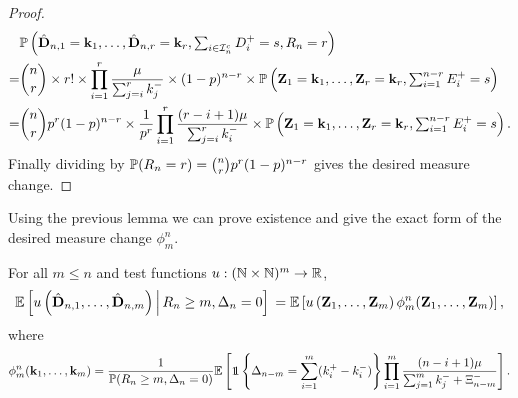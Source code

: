 \begin{proof}
\begin{align*}
        & \P\left(\hat{\vD}_{n, 1} = \vk_1, \ldots, \hat{\vD}_{n, r} = \vk_r, \textstyle \sum_{i \in \cI_n^c} D_i^+ = s, R_n = r \right) \\
        =& \binom{n}{r} \times r!
        \times \prod_{i=1}^r \frac{\mu}{\sum_{j=i}^r k_j^-} \times (1-p)^{n-r}
        \times \P\left(\vZ_1 = \vk_1, \ldots, \vZ_r = \vk_r, \textstyle \sum_{i=1}^{n-r} E_i^+ = s \right) \\
        =& \binom{n}{r} p^r (1-p)^{n-r} \times \frac{1}{p^r} \prod_{i=1}^r \frac{(r-i+1) \mu}{\sum_{j=i}^r k_i^-}
        \times \P\left(\vZ_1 = \vk_1, \ldots, \vZ_r = \vk_r, \textstyle \sum_{i=1}^{n-r} E_i^+ = s \right).
    \end{align*}
    Finally dividing by $\P(R_n = r) = \binom{n}{r} p^r (1-p)^{n-r}$ gives the desired measure change.
\end{proof}

Using the previous lemma we can prove existence and give the exact form of the desired measure change $\phi^n_m$.

\begin{lemma}
    \label{lem:exact-measure-change}
    For all $m \leq n$ and test functions $u: (\N \times \N)^m \to \R$,
    \begin{equation*}
        \E \left[
            u\left( \hat{\vD}_{n, 1}, \ldots, \hat{\vD}_{n, m} \right)
            \,\middle\vert\,
            R_n \geq m,
            \Delta_n = 0
        \right] \\
        =
        \E \left[
            u\left( \vZ_1, \ldots, \vZ_m \right)
            \phi^n_m(\vZ_1, \ldots, \vZ_m)
        \right],
    \end{equation*}
    where
    \begin{align*}
        \phi^n_m(\vk_1, \ldots, \vk_m) =
        \frac{1}{\P(R_n \geq m, \Delta_n = 0)} \E\left[ 
            \one \left\{ \Delta_{n-m} = \sum_{i=1}^m (k_i^+ - k_i^-) \right\}
            \prod_{i=1}^m \frac{(n - i + 1) \mu}{\sum_{j=1}^m k_j^- + \Xi_{n-m}^-}
        \right].
    \end{align*}
\end{lemma}

